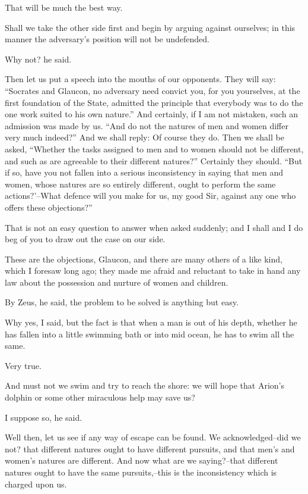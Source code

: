 That will be much the best way.

Shall we take the other side first and begin by arguing against
ourselves; in this manner the adversary's position will not be
undefended.

Why not? he said.

Then let us put a speech into the mouths of our opponents. They will
say: ``Socrates and Glaucon, no adversary need convict you, for you
yourselves, at the first foundation of the State, admitted the principle
that everybody was to do the one work suited to his own nature.'' And
certainly, if I am not mistaken, such an admission was made by us. ``And
do not the natures of men and women differ very much indeed?'' And we
shall reply: Of course they do. Then we shall be asked, ``Whether the
tasks assigned to men and to women should not be different, and such as
are agreeable to their different natures?'' Certainly they should. ``But
if so, have you not fallen into a serious inconsistency in saying that
men and women, whose natures are so entirely different, ought to perform
the same actions?'--What defence will you make for us, my good Sir,
against any one who offers these objections?''

That is not an easy question to answer when asked suddenly; and I shall
and I do beg of you to draw out the case on our side.

These are the objections, Glaucon, and there are many others of a like
kind, which I foresaw long ago; they made me afraid and reluctant to
take in hand any law about the possession and nurture of women and
children.

By Zeus, he said, the problem to be solved is anything but easy.

Why yes, I said, but the fact is that when a man is out of his depth,
whether he has fallen into a little swimming bath or into mid ocean, he
has to swim all the same.

Very true.

And must not we swim and try to reach the shore: we will hope that
Arion's dolphin or some other miraculous help may save us?

I suppose so, he said.

Well then, let us see if any way of escape can be found. We
acknowledged--did we not? that different natures ought to have different
pursuits, and that men's and women's natures are different. And now
what are we saying?--that different natures ought to have the same
pursuits,--this is the inconsistency which is charged upon us.

